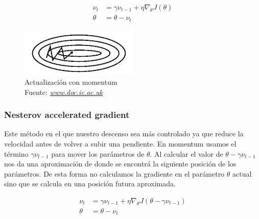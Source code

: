 \begin{equation}
\label{mbgds}
\begin{aligned}
\nu_{t}&=\gamma \nu_{t-1} +  \eta \nabla_{\theta} J(\theta)\\
\theta &= \theta -\nu_{t}
\end{aligned}
\end{equation}

\begin{figure}[H]
	\centering
	\includegraphics[width=0.5\textwidth]{Figures/momentum2.png}
	\caption{Actualización con momentum \\ Fuente:  \href{https://www.doc.ic.ac.uk/~js4416/163/website/neural-networks/optimisers.html}{\textit{www.doc.ic.ac.uk}}}
	\label{momentum2 }
\end{figure}

\subsubsection{Nesterov accelerated gradient}
Este método en el que nuestro descenso sea más controlado ya que reduce la velocidad antes de volver a subir una pendiente. En momentum usamos el término $\gamma \nu_{t-1}$ para mover los parámetros de $\theta$. Al calcular el valor de $\theta - \gamma \nu_{t-1}$ nos da una aproximación de donde se encontrá la siguiente posición de los parámetros. De esta forma no calculamos la gradiente en el parámetro $\theta$ actual sino que se calcula en una posición futura aproximada.




\begin{equation}
\label{mbgds}
\begin{aligned}
\nu_{t}&=\gamma \nu_{t-1} + \eta \nabla_{\theta} J(\theta- \gamma \nu_{t-1})\\
\theta &= \theta -\nu_{t}
\end{aligned}
\end{equation}

